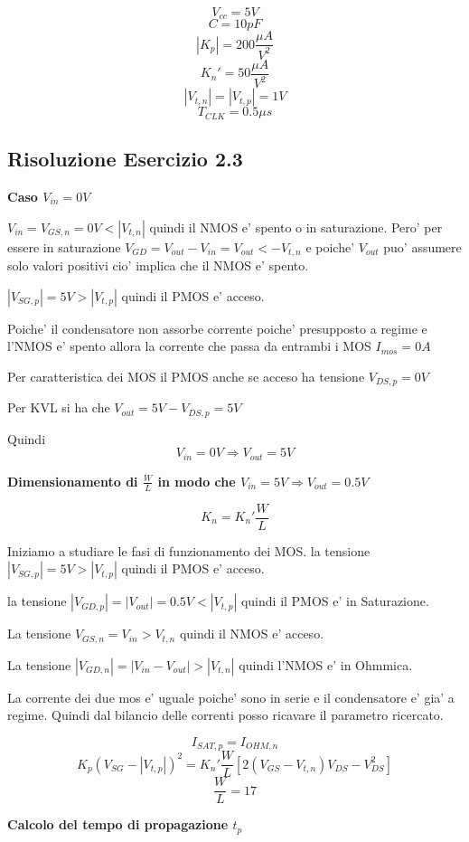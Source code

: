 \documentclass[\main/main.tex]{subfiles}
\begin{document}
\[V_{cc} = 5V\]
\[C = 10pF\]
\[|K_p| = 200 \frac{\mu A}{V^2}\]
\[K_n' = 50 \frac{\mu A}{V^2}\]
\[|V_{t,n}| = |V_{t,p}| = 1V\]
\[T_{CLK} = 0.5\mu s\]

\clearpage
\subsection{Risoluzione Esercizio 2.3}

\textbf{Caso $V_{in} = 0V$}

$V_{in} = V_{GS,n} = 0V < |V_{t,n}|$ quindi il NMOS e' spento o in saturazione.
Pero' per essere in saturazione $V_{GD} = V_{out} - V_{in} = V_{out} < -V_{t,n}$
e poiche' $V_{out}$ puo' assumere solo valori positivi cio' implica che il NMOS e' spento.

$|V_{SG,p}| = 5V > |V_{t,p}|$ quindi il PMOS e' acceso.

Poiche' il condensatore non assorbe corrente poiche' presupposto a regime e l'NMOS e' spento allora la corrente che passa da entrambi i MOS $I_{mos} = 0A$

Per caratteristica dei MOS il PMOS anche se acceso ha tensione $V_{DS,p} = 0V$

Per KVL si ha che $V_{out} = 5V - V_{DS,p} = 5V$

Quindi \[ V_{in} = 0V \Rightarrow V_{out} = 5V\]

\textbf{Dimensionamento di $\frac{W}{L}$ in modo che $V_{in} = 5V \Rightarrow V_{out} = 0.5V$}

\[ K_n = K_n' \frac{W}{L} \]

Iniziamo a studiare le fasi di funzionamento dei MOS.
la tensione $|V_{SG,p}| = 5V > |V_{t,p}|$ quindi il PMOS e' acceso.

la tensione $|V_{GD,p}| = |V_{out}| = 0.5V < |V_{t,p}|$ quindi il PMOS e' in Saturazione.

La tensione $V_{GS,n} = V_{in} > V_{t,n}$ quindi il NMOS e' acceso.

La tensione $|V_{GD,n}| = |V_{in} - V_{out}| > |V_{t,n}|$ quindi l'NMOS e' in Ohmmica.

La corrente dei due mos e' uguale poiche' sono in serie e il condensatore e' gia' a regime.
Quindi dal bilancio delle correnti posso ricavare il parametro ricercato.

\[I_{SAT,p} = I_{OHM,n}\]
\[K_p \left(V_{SG} - |V_{t,p}| \right)^2 = K_n' \frac{W}{L} \left[ 2 \left( V_{GS} - V_{t,n} \right) V_{DS} - V_{DS}^2 \right]\]
\[\frac{W}{L} = 17\]

\textbf{Calcolo del tempo di propagazione $t_p$}
\end{document}
